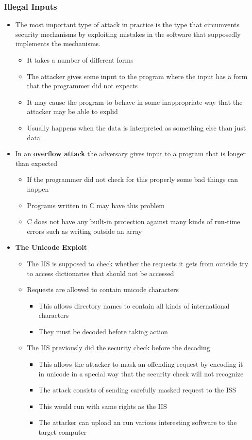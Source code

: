 \documentclass[11pt]{article}
\begin{document}
\subsubsection{Illegal Inputs}
\label{sec:orgda6e5c3}
\begin{itemize}
\item The most important type of attack in practice is the type that circumvents security mechanisms by exploiting mistakes in the software that supposedly implements the mechanisms.
\begin{itemize}
\item It takes a number of different forms
\item The attacker gives some input to the program where the input has a form that the programmer did not expects
\item It may cause the program to behave in some inappropriate way that the attacker may be able to explid
\item Usually happens when the data is interpreted as something else than just data
\end{itemize}

\item In an \textbf{overflow attack} the adversary gives input to a program that is longer than expected
\begin{itemize}
\item If the programmer did not check for this properly some bad things can happen
\item Programs written in C may have this problem
\item C does not have any built-in protection against many kinds of run-time errors such as writing outside an array
\end{itemize}

\item \textbf{The Unicode Exploit}
\begin{itemize}
\item The IIS is supposed to check whether the requests it gets from outside try to access dictionaries that should not be accessed
\item Requests are allowed to contain unicode characters
\begin{itemize}
\item This allows directory names to contain all kinds of international characters
\item They must be decoded before taking action
\end{itemize}
\item The IIS previously did the security check before the decoding
\begin{itemize}
\item This allows the attacker to mask an offending request by encoding it in unicode in a special way that the security check will not recognize
\item The attack consists of sending carefully masked request to the ISS
\item This would run with same rights as the IIS
\item The attacker can upload an run various interesting software to the target computer
\end{itemize}
\end{itemize}


\end{itemize}
\end{document}
